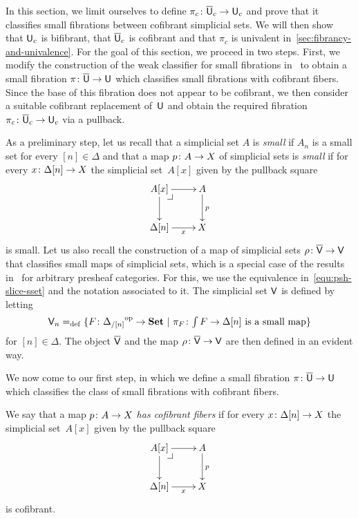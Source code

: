 \documentclass[reqno,10pt,a4paper,oneside,draft]{amsart}
\begin{document}
In this section, we limit ourselves to define $\pi_c \colon \overline{\mathsf{U}}_c \to \mathsf{U}_c$ and prove that it
classifies small fibrations between cofibrant simplicial sets. We will then show 
that $\mathsf{U}_c$ is bifibrant, that $\overline{\mathsf{U}}_c$ is cofibrant  and that $\pi_c$ is univalent 
in~\cref{sec:fibrancy-and-univalence}. For the goal of this section, we proceed in two steps. First, we modify  the construction of the weak classifier for small fibrations in~\cite{voevodsky-simplicial-model} to obtain a small fibration $\pi \colon \overline{\mathsf{U}} \to \mathsf{U}$ which classifies small fibrations with cofibrant fibers. Since the base of this fibration does not appear to be cofibrant,
we then consider a suitable cofibrant replacement  of~$\mathsf{U}$ and obtain the required fibration $\pi_c \colon \overline{\mathsf{U}}_c \to \mathsf{U}_c$ via a pullback. 

\medskip

As a preliminary step, let us recall that a simplicial set $A$ is \emph{small}  if $A_n$ is a small set for every $[n] \in \Delta$ and that a map $p \colon A \to X$ of simplicial sets is \emph{small} if for every $x \colon \Delta[n] 
\to X$ the simplicial set~$A[x]$ given by the pullback square
\[
\xymatrix{
A[x] \ar[r] \ar[d] \drpullback & A \ar[d]^{p} \\
\Delta[n] \ar[r]_-{x} & X }
\]
is small. Let us also recall the  construction of a map of simplicial sets $\rho \colon \overline{\mathsf{V}} \to \mathsf{V}$ that classifies
small maps of simplicial sets, which is a special case of the results in~\cite{hofmann-streicher-universes} for arbitrary presheaf categories.  For this, we use the equivalence in~\eqref{equ:psh-slice-sset} and the notation associated to it.
The simplicial set $\mathsf{V}$ is defined by letting
\[
\mathsf{V}_n =_{\operatorname{def}} \{ F \colon {\Delta_{/[n]}}^{\operatorname{op}} \to \mathbf{Set} \ | \ \pi_F \colon \textstyle{\int F} \to \Delta[n] \text{ is a small
map} \}
\]
for $[n] \in \Delta$. The object $\overline{\mathsf{V}}$ and the map $\rho \colon \overline{\mathsf{V}} \to \mathsf{V}$ are then defined in an evident way. 


\bigskip

We now come to our first step, in which we define a small fibration $\pi \colon \overline{\mathsf{U}} \to \mathsf{U}$ which 
classifies the class of small fibrations with cofibrant fibers. 

\begin{definition} We say that a map $p \colon A \to X$ \emph{has cofibrant fibers} if for every $x \colon \Delta[n] 
\to X$ the simplicial set~$A[x]$ given by the pullback square
\[
\xymatrix{
A[x] \ar[r] \ar[d] \drpullback & A \ar[d]^{p} \\
\Delta[n] \ar[r]_-{x} & X }
\]
is cofibrant.
\end{definition}
\end{document}
